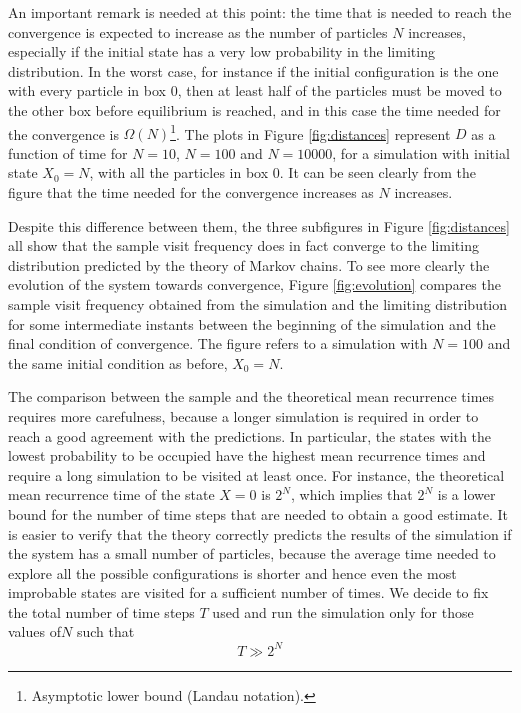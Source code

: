 An important remark is needed at this point: the time that is needed to reach the convergence is expected to increase as the number of particles $N$ increases, especially if the initial state has a very low probability in the limiting distribution. In the worst case, for instance if the initial configuration is the one with every particle in box 0, then at least half of the particles must be moved to the other box before equilibrium is reached, and in this case the time needed for the convergence is $\Omega(N)$\footnote{Asymptotic lower bound (Landau notation).}. The plots in Figure \ref{fig:distances} represent $D$ as a function of time for $N = 10$, $N = 100$ and $N = 10000$, for a simulation with initial state $X_0 = N$, \ie with all the particles in box 0. It can be seen clearly from the figure that the time needed for the convergence increases as $N$ increases.

Despite this difference between them, the three subfigures in Figure \ref{fig:distances} all show that the sample visit frequency does in fact converge to the limiting distribution predicted by the theory of Markov chains. To see more clearly the evolution of the system towards convergence, Figure \ref{fig:evolution} compares the sample visit frequency obtained from the simulation and the limiting distribution for some intermediate instants between the beginning of the simulation and the final condition of convergence. The figure refers to a simulation with $N = 100$ and the same initial condition as before, \ie $X_0 = N$. 

\medskip
The comparison between the sample and the theoretical mean recurrence times requires more carefulness, because a longer simulation is required in order to reach a good agreement with the predictions. In particular, the states with the lowest probability to be occupied have the highest mean recurrence times and require a long simulation to be visited at least once. For instance, the theoretical mean recurrence time of the state $X= 0$ is $2^N$, which implies that $2^N$ is a lower bound for the number of time steps that are needed to obtain a good estimate. It is easier to verify that the theory correctly predicts the results of the simulation if the system has a small number of particles, because the average time needed to explore all the possible configurations is shorter and hence even the most improbable states are visited for a sufficient number of times. We decide to fix the total number of time steps $T$ used and run the simulation only for those values of$N$ such that
\begin{equation}\label{eq:time}
  T \gg 2^N
\end{equation}

